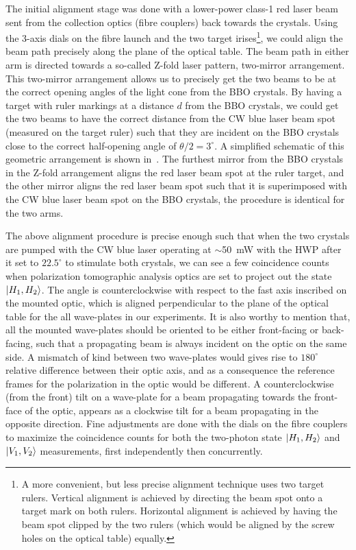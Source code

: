 The initial alignment stage was done with a lower-power class-1 red laser beam sent from the collection optics (fibre couplers) back towards the crystals. Using the 3-axis dials on the fibre launch and the two target irises\footnote[][20pt]{A more convenient, but less precise alignment technique uses two target rulers. Vertical alignment is achieved by directing the beam spot onto a target mark on both rulers. Horizontal alignment is achieved by having the beam spot clipped by the two rulers (which would be aligned by the screw holes on the optical table) equally.}, we could align the beam path precisely along the plane of the optical table. The beam path in either arm is directed towards a so-called Z-fold laser pattern, two-mirror arrangement. This two-mirror arrangement allows us to precisely get the two beams to be at the correct opening angles of the light cone from the \acs{BBO} crystals. By having a target with ruler markings at a distance $d$ from the \acs{BBO} crystals, we could get the two beams to have the correct distance from the \acs{CW} blue laser beam spot (measured on the target ruler) such that they are incident on the \acs{BBO} crystals close to the correct half-opening angle of $\theta/2 = 3^{\circ}$. A simplified schematic of this geometric arrangement is shown in~. The furthest mirror from the \acs{BBO} crystals in the Z-fold arrangement aligns the red laser beam spot at the ruler target, and the other mirror aligns the red laser beam spot such that it is superimposed with the \acs{CW} blue laser beam spot on the \acs{BBO} crystals, the procedure is identical for the two arms.


\clearpage
\noindent
The above alignment procedure is precise enough such that when the two crystals are pumped with the \acs{CW} blue laser operating at $\sim$\SI{50}{\milli\watt} with the \acs{HWP} after it set to $22.5^{\circ}$ to stimulate both crystals, we can see a few coincidence counts when polarization tomographic analysis optics are set to project out the state $\ket{H_1,H_2}$. The angle is counterclockwise with respect to the fast axis inscribed on the mounted optic, which is aligned perpendicular to the plane of the optical table for the all wave-plates in our experiments. It is also worthy to mention that, all the mounted wave-plates should be oriented to be either front-facing or back-facing, such that a propagating beam is always incident on the optic on the same side. A mismatch of kind between two wave-plates would gives rise to $180^{\circ}$ relative difference between their optic axis, and as a consequence the reference frames for the polarization in the optic would be different.  A counterclockwise (from the front) tilt on a wave-plate for a beam propagating towards the front-face of the optic, appears as a clockwise tilt for a beam propagating in the opposite direction. Fine adjustments are done with the dials on the fibre couplers to maximize the coincidence counts for both the two-photon state $\ket{H_1, H_2}$ and $\ket{V_1,V_2}$ measurements, first independently then concurrently.



